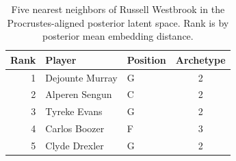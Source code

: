 \begin{table}[htbp]
  \centering\small
  \begin{tabular}{rllc}
    \toprule
    Rank & Player & Position & Archetype \\
    \midrule
    1 & Dejounte Murray & G & 2 \\
    2 & Alperen Sengun & C & 2 \\
    3 & Tyreke Evans & G & 2 \\
    4 & Carlos Boozer & F & 3 \\
    5 & Clyde Drexler & G & 2 \\
    \bottomrule
  \end{tabular}
  \caption{Five nearest neighbors of Russell Westbrook in the Procrustes-aligned posterior latent space. Rank is by posterior mean embedding distance.}
  \label{tab:Russell_Westbrook_neighbors}
\end{table}

